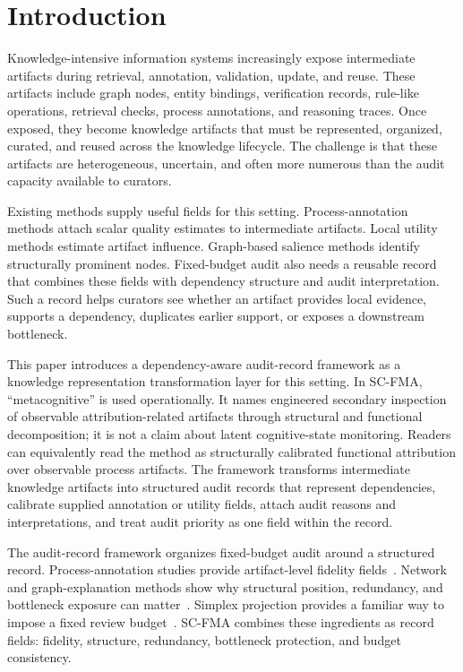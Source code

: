 \documentclass[pdflatex,sn-mathphys-num,iicol]{sn-jnl}
\begin{document}
\section{Introduction}

Knowledge-intensive information systems increasingly expose intermediate artifacts during retrieval, annotation, validation, update, and reuse. These artifacts include graph nodes, entity bindings, verification records, rule-like operations, retrieval checks, process annotations, and reasoning traces. Once exposed, they become knowledge artifacts that must be represented, organized, curated, and reused across the knowledge lifecycle. The challenge is that these artifacts are heterogeneous, uncertain, and often more numerous than the audit capacity available to curators.

Existing methods supply useful fields for this setting. Process-annotation methods attach scalar quality estimates to intermediate artifacts. Local utility methods estimate artifact influence. Graph-based salience methods identify structurally prominent nodes. Fixed-budget audit also needs a reusable record that combines these fields with dependency structure and audit interpretation. Such a record helps curators see whether an artifact provides local evidence, supports a dependency, duplicates earlier support, or exposes a downstream bottleneck.

This paper introduces a dependency-aware audit-record framework as a knowledge representation transformation layer for this setting. In SC-FMA, ``metacognitive'' is used operationally. It names engineered secondary inspection of observable attribution-related artifacts through structural and functional decomposition; it is not a claim about latent cognitive-state monitoring. Readers can equivalently read the method as structurally calibrated functional attribution over observable process artifacts. The framework transforms intermediate knowledge artifacts into structured audit records that represent dependencies, calibrate supplied annotation or utility fields, attach audit reasons and interpretations, and treat audit priority as one field within the record.

The audit-record framework organizes fixed-budget audit around a structured record. Process-annotation studies provide artifact-level fidelity fields~\cite{lightman2023verify,uesato2022solving}. Network and graph-explanation methods show why structural position, redundancy, and bottleneck exposure can matter~\cite{albert2000error,newman2010networks,ying2019gnnexplainer}. Simplex projection provides a familiar way to impose a fixed review budget~\cite{wang2013projection}. SC-FMA combines these ingredients as record fields: fidelity, structure, redundancy, bottleneck protection, and budget consistency.
\end{document}
